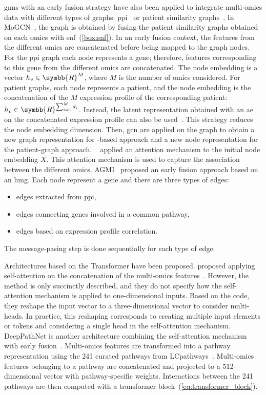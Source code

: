 \documentclass[../main.tex]{subfiles}
\begin{document}
		\Glspl{gnn} with an early fusion strategy have also been applied to integrate multi-omics data with different types of graphs: \gls{ppi}~\cite{Althubaiti_2021,Guo2023} or patient similarity graphs~\cite{MoGCN}.
		In MoGCN~\cite{MoGCN}, the graph is obtained by fusing the patient similarity graphs obtained on each omics with \gls{snf}~(\cref{box:snf}).
		In an early fusion context, the features from the different omics are concatenated before being mapped to the graph nodes.
		For the \gls{ppi} graph each node represents a gene; therefore, features corresponding to this gene from the different omics are concatenated.
		The node embedding is a vector \(h_{v} \in \symbb{R}^{M}\), where \(M\) is the number of omics considered.
		For patient graphs, each node represents a patient, and the node embedding is the concatenation of the \(M\) expression profile of the corresponding patient: \(h_{v} \in \symbb{R}^{\sum_{i=1}^{M}d_i}\).
		Instead, the latent representation obtained with an \gls{ae} on the concatenated expression profile can also be used~\cite{MoGCN}.
		This strategy reduces the node embedding dimension.
		Then, \gls{gcn} are applied on the graph to obtain a new graph representation for -based approach and a new node representation for the patient-graph approach.
		\citeauthor{Guo2023}~\cite{Guo2023} applied an attention mechanism to the initial node embedding \(X\).
		This attention mechanism is used to capture the association between the different omics.
		AGMI~\cite{AGMI} proposed an early fusion approach based on an \gls{hmg}.
		Each node represent a gene and there are three types of edges:
		\begin{itemize}[nosep]
			\item edges extracted from \gls{ppi},
			\item edges connecting genes involved in a common pathway,
			\item edges based on expression profile correlation.
		\end{itemize}
		The message-pasing step is done sequentially for each type of edge.

		Architectures based on the Transformer have been proposed.
		\citeauthor{SubtypeFormer} proposed applying self-attention on the concatenation of the multi-omics features~\cite{SubtypeFormer}.
		However, the method is only succinctly described, and they do not specify how the self-attention mechanism is applied to one-dimensional inputs.
		Based on the code, they reshape the input vector to a three-dimensional vector to consider multi-heads.
		In practice, this reshaping corresponds to creating multiple input elements or tokens and considering a single head in the self-attention mechanism.
		DeepPathNet is another architecture combining the self-attention mechanism with early fusion~\cite{DeepPathNet}.
		Multi-omics features are transformed into a pathway representation using the 241 curated pathways from LCpathways~\cite{LCpathways}.
		Multi-omics features belonging to a pathway are concatenated and projected to a 512-dimensional vector with pathway-specific weights.
		Interactions between the 241 pathways are then computed with a transformer block~(\cref{eq:transformer_block}).
\end{document}
